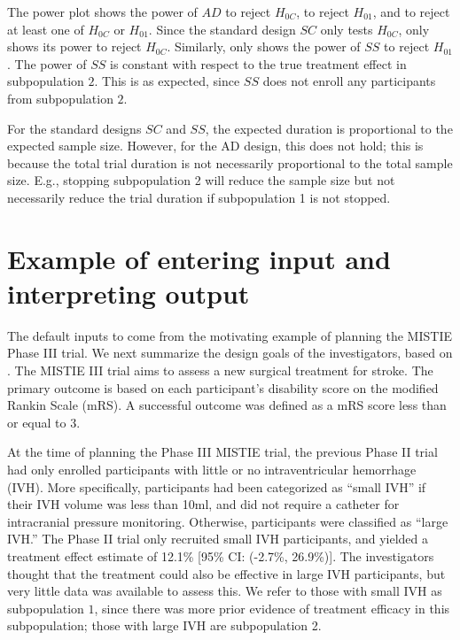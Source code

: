 \documentclass[article]{jss}
\begin{document}
The power plot shows the power of $AD$ to reject $H_{0C}$, to reject $H_{01}$, and to reject at least one of $H_{0C}$ or $H_{01}$. Since the standard design $SC$ only tests $H_{0C}$,  only shows its power to reject $H_{0C}$. Similarly,  only shows the power of $SS$ to reject $H_{01}$. 
The power of $SS$ is constant with respect to the true treatment effect in subpopulation $2$. This is as expected, since $SS$ does not enroll any participants from subpopulation $2$. 

For the standard designs $SC$ and $SS$, the expected duration is proportional to the expected sample size. 
However, for the AD design, this does not hold; this is because the total trial duration is not necessarily proportional to the total sample size. E.g., stopping subpopulation 2 will reduce the sample size but not necessarily reduce the trial duration if subpopulation 1 is not stopped.

\section{Example of entering input and interpreting output}
\label{sec:example}

The default inputs to  come from the motivating example of planning the MISTIE Phase III trial. We next summarize the design goals of the investigators, based on \citep{Rosenblum2013AdaptMISTIE}. The MISTIE III trial aims to assess a new surgical treatment for stroke. The primary outcome is based on
 each participant's  disability score on the modified Rankin Scale (mRS). A successful outcome was defined as a mRS score less than or equal to 3. 

At the time of planning the Phase III MISTIE trial, the previous Phase II trial had only enrolled participants with little or no intraventricular hemorrhage (IVH). More specifically, participants had been categorized as ``small IVH'' if their IVH volume was less than 10ml, and did not require a catheter for intracranial pressure monitoring. Otherwise, participants were classified as ``large IVH.'' The Phase II trial only recruited small IVH participants, and yielded a treatment effect estimate of 12.1\% [95\% CI: (-2.7\%, 26.9\%)]. The investigators thought that the treatment could also be effective in large IVH participants, but very little data was available to assess this. We refer to those with small IVH as subpopulation $1$, since there was more prior evidence of treatment efficacy in this subpopulation; those with large IVH  are subpopulation 2.
\end{document}
